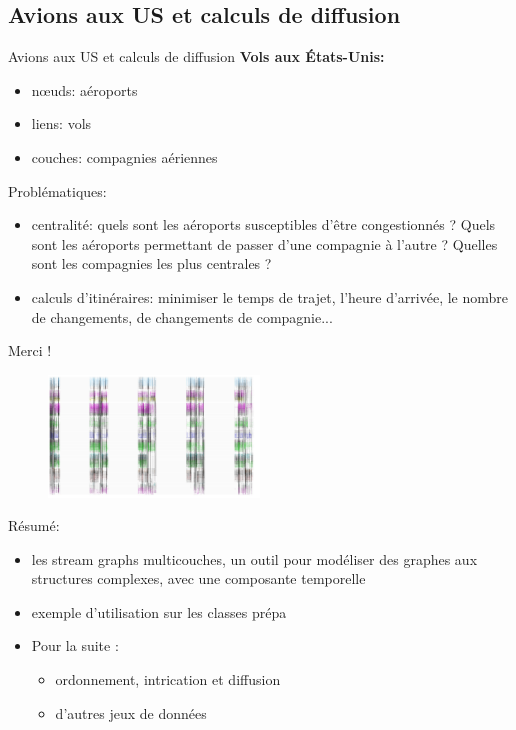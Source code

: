 \documentclass[15pt]{beamer}
\def \stgms {stream graphs multicouches}
\begin{document}
\subsection{Avions aux US et calculs de diffusion}
\begin{frame}{Avions aux US et calculs de diffusion}
    \textbf{Vols aux États-Unis:}
    \begin{itemize}
        \item n\oe{}uds: aéroports
        \item liens: vols
        \item couches: compagnies aériennes
    \end{itemize}
    Problématiques:
    \begin{itemize}
        \item centralité: quels sont les aéroports susceptibles d'être congestionnés ? Quels sont les aéroports permettant de passer d'une compagnie à l'autre ? Quelles sont les compagnies les plus centrales ?
        \item calculs d'itinéraires: minimiser le temps de trajet, l'heure d'arrivée, le nombre de changements, de changements de compagnie...
    \end{itemize}
\end{frame}

\begin{frame}{Merci !}
    \begin{figure}
        \centering
        \includegraphics[width=0.5\textwidth]{img/lyceeentier.JPG}
    \end{figure}
	Résumé: 
	\begin{itemize}
	    \item les \stgms{}, un outil pour modéliser des graphes aux structures complexes, avec une composante temporelle
	    \item exemple d'utilisation sur les classes prépa
	    \item Pour la suite : 
	    \begin{itemize}
	        \item ordonnement, intrication et diffusion
	        \item d'autres jeux de données
	    \end{itemize}
	\end{itemize}
\end{frame}
\end{document}

